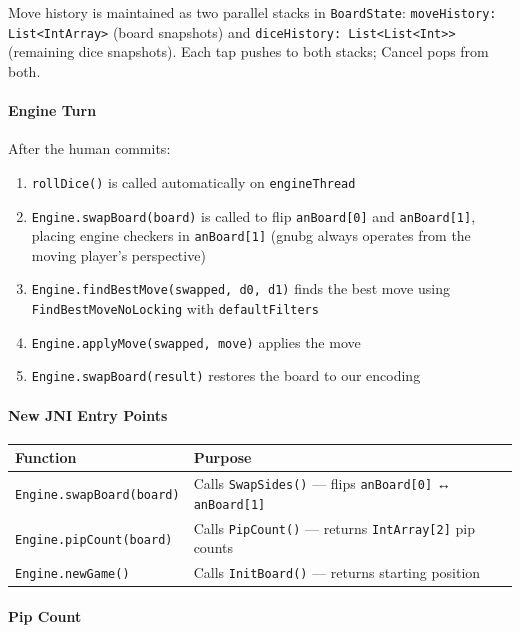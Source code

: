 \documentclass[11pt,a4paper]{article}
\providecommand{\tightlist}{\setlength{\itemsep}{2pt}\setlength{\parskip}{0pt}}
\begin{document}
Move history is maintained as two parallel stacks in
\texttt{BoardState}: \texttt{moveHistory: List<IntArray>} (board
snapshots) and \texttt{diceHistory: List<List<Int>>} (remaining dice
snapshots). Each tap pushes to both stacks; Cancel pops from both.

\paragraph{Engine Turn}\label{engine-turn-v094}

After the human commits:

\begin{enumerate}
\def\labelenumi{\arabic{enumi}.}
\tightlist
\item
  \texttt{rollDice()} is called automatically on \texttt{engineThread}
\item
  \texttt{Engine.swapBoard(board)} is called to flip \texttt{anBoard[0]}
  and \texttt{anBoard[1]}, placing engine checkers in \texttt{anBoard[1]}
  (gnubg always operates from the moving player's perspective)
\item
  \texttt{Engine.findBestMove(swapped, d0, d1)} finds the best move
  using \texttt{FindBestMoveNoLocking} with \texttt{defaultFilters}
\item
  \texttt{Engine.applyMove(swapped, move)} applies the move
\item
  \texttt{Engine.swapBoard(result)} restores the board to our encoding
\end{enumerate}

\paragraph{New JNI Entry Points}\label{new-jni-v094}

\begin{longtable}[]{@{}ll@{}}
\toprule\noalign{}
Function & Purpose \\
\midrule\noalign{}
\endhead
\bottomrule\noalign{}
\endlastfoot
\texttt{Engine.swapBoard(board)} & Calls \texttt{SwapSides()} — flips \texttt{anBoard[0]} ↔ \texttt{anBoard[1]} \\
\texttt{Engine.pipCount(board)} & Calls \texttt{PipCount()} — returns \texttt{IntArray[2]} pip counts \\
\texttt{Engine.newGame()} & Calls \texttt{InitBoard()} — returns starting position \\
\end{longtable}

\paragraph{Pip Count}\label{pip-count-v094}
\end{document}
